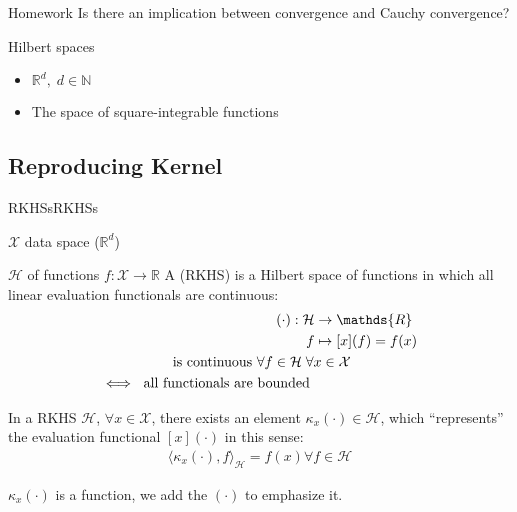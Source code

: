 \begin{question}{Homework}{}
	Is there an implication between convergence and Cauchy convergence?
\end{question}

\begin{example}{Hilbert spaces}{}
	\begin{itemize}
		\item $\mathds{R}^d, \; d \in \mathds{N}$
		\item The space of square-integrable functions
	\end{itemize}
\end{example}

\subsection{Reproducing Kernel}

\begin{definition}[parbox=false]{RKHSs}{RKHSs}

	$\mathcal{X}$ data space ($\mathds{R}^d$)

	$\mathcal{H}$ of functions $f: \mathcal{X} \to \mathds{R}$
	\tcbline
	A  (RKHS) is a Hilbert space
	of functions in which all linear evaluation functionals are continuous:
	\begin{align*}
		[x](\cdot) : \mathcal{H} & \to \mathds{R}                                     \\
		f                        & \mapsto [x](f) = f(x)                              \\
		\span
		\text{ is continuous } \forall f \in \mathcal{H} \; \forall x \in \mathcal{X} \\
		\iff \text{ all functionals are bounded }
	\end{align*}
\end{definition}

\begin{theorem}{}{}
	In a RKHS $\mathcal{H}$, $\forall x \in \mathcal{X}$, there
	exists an element $\kappa_x(\cdot) \in \mathcal{H}$, which
	``represents'' the evaluation functional $[x](\cdot)$
	in this sense:
	\begin{align*}
		\langle \kappa_x(\cdot), f \rangle_{\mathcal{H}} = f(x) \forall f \in \mathcal{H}
	\end{align*}
	\begin{marker}
		$\kappa_x(\cdot)$ is a function, we add the $(\cdot)$ to emphasize it.
	\end{marker}
\end{theorem}


